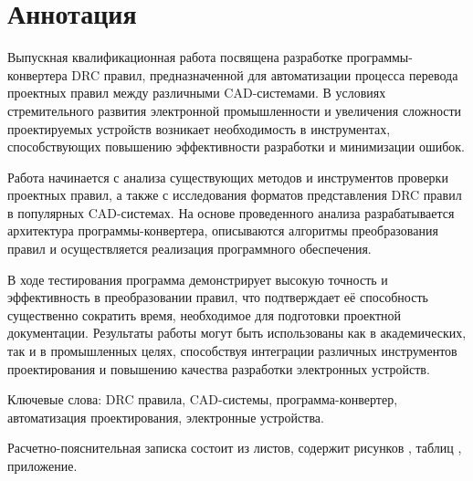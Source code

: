 
\chapter*{Аннотация}

Выпускная квалификационная работа посвящена разработке
программы-конвертера DRC правил,
предназначенной для автоматизации процесса перевода проектных правил
между различными CAD-системами.
В условиях стремительного развития электронной промышленности
и увеличения сложности проектируемых устройств возникает необходимость
в инструментах, способствующих повышению эффективности разработки
и минимизации ошибок.

Работа начинается с анализа существующих методов
и инструментов проверки проектных правил,
а также с исследования форматов представления DRC правил
в популярных CAD-системах.
На основе проведенного анализа разрабатывается архитектура
программы-конвертера, описываются алгоритмы преобразования правил
и осуществляется реализация программного обеспечения.

В ходе тестирования программа демонстрирует высокую точность
и эффективность в преобразовании правил,
что подтверждает её способность существенно сократить время,
необходимое для подготовки проектной документации.
Результаты работы могут быть использованы как в академических,
так и в промышленных целях,
способствуя интеграции различных инструментов проектирования
и повышению качества разработки электронных устройств.

Ключевые слова:
DRC правила, CAD-системы, программа-конвертер,
автоматизация проектирования, электронные устройства.

Расчетно-пояснительная записка
состоит из \pageref{lastpage} листов,
содержит
\totalfigures рисунков
, \totaltables таблиц
,  приложение.


